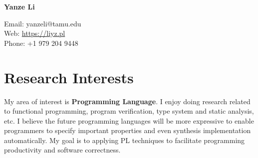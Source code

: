 \documentclass[12pt,letterpaper]{report}
\newcommand{\myname}{Yanze Li}
\newcommand{\namefont}[1]{{\normalfont\bfseries\Huge{#1}}}
\newcommand{\listitemspace}{0.15em}
\renewenvironment{itemize}
{\begin{list}{}{\setlength{\leftmargin}{0em}
			\setlength{\parskip}{0em}
			\setlength{\itemsep}{\listitemspace}
			\setlength{\parsep}{\listitemspace}}}
	{\end{list}}
\begin{document}
	\raggedright
	
	\namefont{\myname}
	
	\vspace{1em}
	\begin{minipage}[t]{0.495\textwidth}
		Email: yanzeli@tamu.edu \\
		Web: \href{https://liyz.pl}{https://liyz.pl} \\
		Phone: +1 979 204 9448
	\end{minipage}
	\vspace{0.5em}
	

	
	\section*{Research Interests}
	
	\begin{itemize}
		\item My area of interest is \textbf{Programming Language}.
		I enjoy doing research related to functional programming, program verification, type system and static analysis, etc.
		I believe the future programming languages will be more expressive to enable programmers to specify important properties and even synthesis implementation automatically. My goal is to applying PL techniques to facilitate programming productivity and software correctness.

	\end{itemize}
\end{document}

